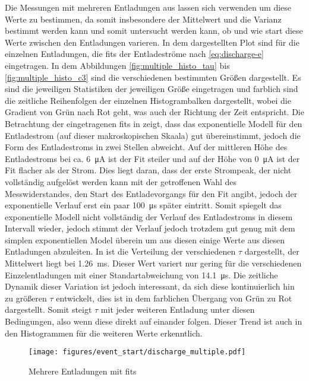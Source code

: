 Die Messungen mit mehreren Entladungen aus  lassen sich verwenden um diese Werte zu bestimmen, da somit insbesondere der Mittelwert und die Varianz bestimmt werden kann und somit untersucht werden kann, ob und wie start diese Werte zwischen den Entladungen varieren. In dem dargestellten Plot sind für die einzelnen Entladungen, die fits der Entladeströme nach \eqref{eq:discharge-e} eingetragen. In dem Abbildungen \ref{fig:multiple_histo_tau} bis \ref{fig:multiple_histo_c3} sind die verschiedenen bestimmten Größen dargestellt. Es sind die jeweiligen Statistiken der jeweiligen Größe eingetragen und farblich sind die zeitliche Reihenfolgen der einzelnen Histogrambalken dargestellt, wobei die Gradient von Grün nach Rot geht, was auch der Richtung der Zeit entspricht. Die Betrachtung der eingetragenen fits in  zeigt, dass das exponentielle Modell für den Entladestrom (auf dieser makroskopischen Skaala) gut übereinstimmt, jedoch die Form des Entladestroms in zwei Stellen abweicht. Auf der mittleren Höhe des Entladestroms bei ca. \SI{6}{\micro\ampere} ist der Fit steiler und auf der Höhe von \SI{0}{\micro\ampere} ist der Fit flacher als der Strom. Dies liegt daran, dass der erste Strompeak, der nicht vollständig aufgelöst werden kann mit der getroffenen Wahl des Messwiderstandes, den Start des Entladevorgangs für den Fit angibt, jedoch der exponentielle Verlauf erst ein paar \SI{100}{\micro\second} später eintritt. Somit spiegelt das exponentielle Modell nicht vollständig der Verlauf des Entladestroms in diesem Intervall wieder, jedoch stimmt der Verlauf jedoch trotzdem gut genug mit dem simplen exponentiellen Model überein um aus diesen einige Werte aus diesen Entladungen abzuleiten. In  ist die Verteilung der verschiedenen \(\tau\) dargestellt, der Mittelwert liegt bei \SI{1,26}{\milli\second}. Dieser Wert variert nur gering für die verschiedenen Einzelentladungen mit einer Standartabweichung von \SI{14,1}{\micro\second}. Die zeitliche Dynamik dieser Variation ist jedoch interessant, da sich diese kontinuierlich hin zu größeren \(\tau\) entwickelt, dies ist in dem farblichen Übergang von Grün zu Rot dargestellt. Somit steigt \(\tau\) mit jeder weiteren Entladung unter diesen Bedingungen, also wenn diese direkt auf einander folgen. Dieser Trend ist auch in den Histogrammen für die weiteren Werte erkenntlich.

\begin{figure}[htbp]
    \centering
    \begin{minipage}[t]{\textwidth}
      \centering
      \texttt{[image: figures/event\_start/discharge\_multiple.pdf]}
      \caption{Mehrere Entladungen mit fits}
      \label{fig:discharge_multiple_fit}
    \end{minipage}
\end{figure}


